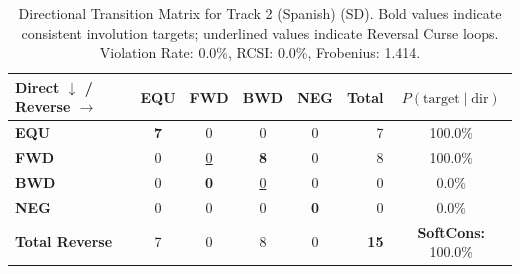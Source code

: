 \begin{table}[ht]
\centering
\small
\begin{tabular}{l|cccc|r|c}
\toprule
\textbf{Direct $\downarrow$ / Reverse $\rightarrow$} & \textbf{EQU} & \textbf{FWD} & \textbf{BWD} & \textbf{NEG} & \textbf{Total} & \textbf{$P(\text{target} \mid \text{dir})$} \\
\midrule
\textbf{EQU} & \textbf{7} & 0 & 0 & 0 & 7 & 100.0\% \\
\textbf{FWD} & 0 & \underline{0} & \textbf{8} & 0 & 8 & 100.0\% \\
\textbf{BWD} & 0 & \textbf{0} & \underline{0} & 0 & 0 & 0.0\% \\
\textbf{NEG} & 0 & 0 & 0 & \textbf{0} & 0 & 0.0\% \\
\midrule
\textbf{Total Reverse} & 7 & 0 & 8 & 0 & \textbf{15} & \textbf{SoftCons:} 100.0\% \\
\bottomrule
\end{tabular}
\caption{Directional Transition Matrix for Track 2 (Spanish) (SD). Bold values indicate consistent involution targets; underlined values indicate Reversal Curse loops. Violation Rate: 0.0\%, RCSI: 0.0\%, Frobenius: 1.414.}
\label{tab:transition_matrix}
\end{table}